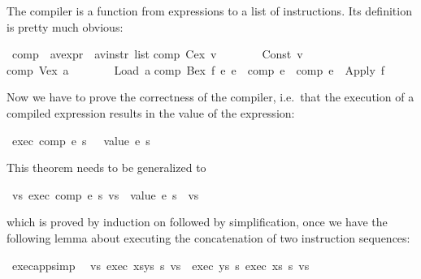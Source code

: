 \begin{isabellebody}
\begin{isamarkuptext}
The compiler is a function from expressions to a list of instructions. Its
definition is pretty much obvious:%
\end{isamarkuptext}%
\ comp\ {\isacharcolon}{\isacharcolon}\ {\isachardoublequote}{\isacharparenleft}{\isacharprime}a{\isacharcomma}{\isacharprime}v{\isacharparenright}expr\ {\isasymRightarrow}\ {\isacharparenleft}{\isacharprime}a{\isacharcomma}{\isacharprime}v{\isacharparenright}instr\ list{\isachardoublequote}\isanewline
{}\isanewline
{\isachardoublequote}comp\ {\isacharparenleft}Cex\ v{\isacharparenright}\ \ \ \ \ \ \ {\isacharequal}\ {\isacharbrackleft}Const\ v{\isacharbrackright}{\isachardoublequote}\isanewline
{\isachardoublequote}comp\ {\isacharparenleft}Vex\ a{\isacharparenright}\ \ \ \ \ \ \ {\isacharequal}\ {\isacharbrackleft}Load\ a{\isacharbrackright}{\isachardoublequote}\isanewline
{\isachardoublequote}comp\ {\isacharparenleft}Bex\ f\ e{}\ e{}{\isacharparenright}\ {\isacharequal}\ {\isacharparenleft}comp\ e{}{\isacharparenright}\ {\isacharat}\ {\isacharparenleft}comp\ e{}{\isacharparenright}\ {\isacharat}\ {\isacharbrackleft}Apply\ f{\isacharbrackright}{\isachardoublequote}%
\begin{isamarkuptext}%
Now we have to prove the correctness of the compiler, i.e.\ that the
execution of a compiled expression results in the value of the expression:%
\end{isamarkuptext}%
\ {\isachardoublequote}exec\ {\isacharparenleft}comp\ e{\isacharparenright}\ s\ {\isacharbrackleft}{\isacharbrackright}\ {\isacharequal}\ {\isacharbrackleft}value\ e\ s{\isacharbrackright}{\isachardoublequote}%
\begin{isamarkuptext}%
\noindent
This theorem needs to be generalized to%
\end{isamarkuptext}%
\ {\isachardoublequote}{\isasymforall}vs{\isachardot}\ exec\ {\isacharparenleft}comp\ e{\isacharparenright}\ s\ vs\ {\isacharequal}\ {\isacharparenleft}value\ e\ s{\isacharparenright}\ {\isacharhash}\ vs{\isachardoublequote}%
\begin{isamarkuptxt}%
\noindent
which is proved by induction on  followed by simplification, once
we have the following lemma about executing the concatenation of two
instruction sequences:%
\end{isamarkuptxt}%
\ exec{\isacharunderscore}app{\isacharbrackleft}simp{\isacharbrackright}{\isacharcolon}\isanewline
\ \ {\isachardoublequote}{\isasymforall}vs{\isachardot}\ exec\ {\isacharparenleft}xs{\isacharat}ys{\isacharparenright}\ s\ vs\ {\isacharequal}\ exec\ ys\ s\ {\isacharparenleft}exec\ xs\ s\ vs{\isacharparenright}{\isachardoublequote}%

\end{isabellebody}
